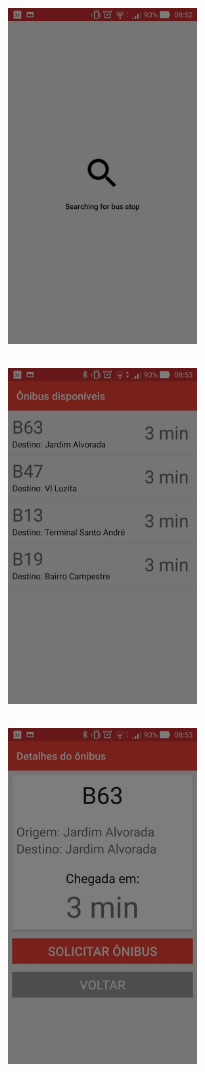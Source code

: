 \documentclass[
	12pt,				%
	oneside,			%
	a4paper,			%
	brazil				%
]{abntex2}
\begin{document}
\includegraphics[width=5cm, center]{images/beacon_searching_bus_stop}
\\
\\
\includegraphics[width=5cm, center]{images/beacon_list_bus}
\\
\\
\includegraphics[width=5cm, center]{images/beacon_detail_bus}
\end{document}

